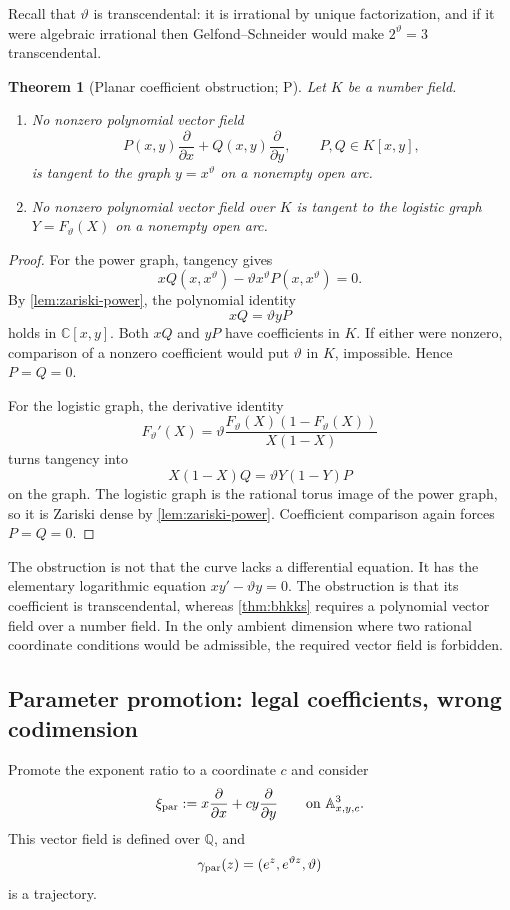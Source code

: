 \documentclass[10pt,oneside]{article}
\newtheorem{theorem}{Theorem}[section]
\theoremstyle{definition}
\theoremstyle{remark}
\newcommand{\Q}{\mathbb Q}
\newcommand{\C}{\mathbb C}
\newcommand{\A}{\mathbb A}
\newcommand{\thetaq}{\vartheta}
\newcommand{\statusP}{\textsc{P}}
\begin{document}
Recall that \(\thetaq\) is transcendental: it is irrational by unique factorization, and if it were algebraic irrational then Gelfond--Schneider would make \(2^{\thetaq}=3\) transcendental.

\begin{theorem}[Planar coefficient obstruction; \statusP]
\label{thm:planar-obstruction}
Let \(K\) be a number field.
\begin{enumerate}[label=(\alph*)]
\item No nonzero polynomial vector field
\[
 P(x,y)\frac{\partial}{\partial x}
 +Q(x,y)\frac{\partial}{\partial y},
 \qquad P,Q\in K[x,y],
\]
is tangent to the graph \(y=x^{\thetaq}\) on a nonempty open arc.
\item No nonzero polynomial vector field over \(K\) is tangent to the logistic graph \(Y=F_{\thetaq}(X)\) on a nonempty open arc.
\end{enumerate}
\end{theorem}

\begin{proof}
For the power graph, tangency gives
\[
 xQ(x,x^{\thetaq})-\thetaq x^{\thetaq}P(x,x^{\thetaq})=0.
\]
By \cref{lem:zariski-power}, the polynomial identity
\[
 xQ=\thetaq yP
\]
holds in \(\C[x,y]\).  Both \(xQ\) and \(yP\) have coefficients in \(K\).  If either were nonzero, comparison of a nonzero coefficient would put \(\thetaq\) in \(K\), impossible.  Hence \(P=Q=0\).

For the logistic graph, the derivative identity
\[
 F_{\thetaq}'(X)
 =\thetaq\frac{F_{\thetaq}(X)(1-F_{\thetaq}(X))}{X(1-X)}
\]
turns tangency into
\[
 X(1-X)Q=\thetaq Y(1-Y)P
\]
on the graph.  The logistic graph is the rational torus image of the power graph, so it is Zariski dense by \cref{lem:zariski-power}.  Coefficient comparison again forces \(P=Q=0\).
\end{proof}

\begin{cautionbox}
The obstruction is not that the curve lacks a differential equation.  It has the elementary logarithmic equation
\(x y'-\thetaq y=0\).  The obstruction is that its coefficient is transcendental, whereas \cref{thm:bhkks} requires a polynomial vector field over a number field.  In the only ambient dimension where two rational coordinate conditions would be admissible, the required vector field is forbidden.
\end{cautionbox}

\subsection{Parameter promotion: legal coefficients, wrong codimension}
Promote the exponent ratio to a coordinate \(c\) and consider
\begin{equation}
 \xi_{\rm par}
 :=x\frac{\partial}{\partial x}
   +cy\frac{\partial}{\partial y}
 \qquad\text{on }\A^3_{x,y,c}.
\label{eq:parameter-field}
\end{equation}
This vector field is defined over \(\Q\), and
\begin{equation}
 \gamma_{\rm par}(z)=(e^z,e^{\thetaq z},\thetaq)
\label{eq:parameter-trajectory}
\end{equation}
is a trajectory.
\end{document}
